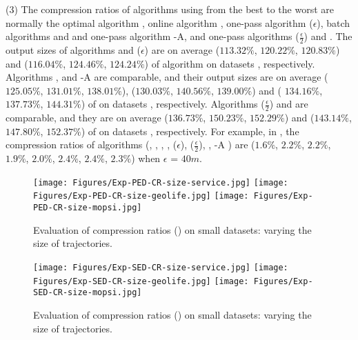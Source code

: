 \sstab(3) The compression ratios of algorithms using \ped from the best
to the worst are normally the optimal algorithm \opt, online algorithm \bqsa, one-pass algorithm \siped($\epsilon$), batch algorithms \tpa and \dpa and one-pass algorithm {\operb-A}, and one-pass algorithms \siped($\frac{\epsilon}{2}$) and \operb.
The output sizes of algorithms \bqsa and \siped({$\epsilon$}) are on average
($113.32\%$, $120.22\%$, $120.83\%$) and ($116.04\%$, $124.46\%$, $124.24\%$) of algorithm \opt
on datasets \dSets, respectively.
Algorithms \tpa, \dpa and {\operb-A} are comparable, and their output sizes are on average
($125.05\%$, $131.01\%$, $138.01\%$), ($130.03\%$, $140.56\%$, $139.00\%$) and {( $134.16\%$, $137.73\%$, $144.31\%$)} of \opt
on datasets \dSets, respectively.
Algorithms \siped($\frac{\epsilon}{2}$) and \operb are comparable, and they are on average
($136.73\%$, $150.23\%$, $152.29\%$) and ($143.14\%$, $147.80\%$, $152.37\%$) of \opt on datasets \dSets, respectively.
%
For example, in \mopsi, the compression ratios of algorithms
(\opt, \tpa, \dpa, \bqsa, \siped(${\epsilon}$), \siped($\frac{\epsilon}{2}$), \operb, {\operb-A} ) are ($1.6\%$, $2.2\%$, $2.2\%$, $1.9\%$, $2.0\%$, $2.4\%$, $2.4\%$, {$2.3\%$}) when $\epsilon$ = $40m$.
%
\begin{figure*}[tb!]
	\centering
	\texttt{[image: Figures/Exp-PED-CR-size-service.jpg]} 	\hspace{0.5ex}
	\texttt{[image: Figures/Exp-PED-CR-size-geolife.jpg]}	\hspace{0.5ex}
	\texttt{[image: Figures/Exp-PED-CR-size-mopsi.jpg]}		
	\vspace{-2ex}
	\caption{\small Evaluation of compression ratios (\ped) on small datasets: varying the size of
		trajectories.}
	\label{fig:cr-ped-size}
	\vspace{-2ex}
\end{figure*}
\begin{figure*}[tb!]
	\centering
	\texttt{[image: Figures/Exp-SED-CR-size-service.jpg]} 	\hspace{0.5ex}
	\texttt{[image: Figures/Exp-SED-CR-size-geolife.jpg]}	\hspace{0.5ex}
	\texttt{[image: Figures/Exp-SED-CR-size-mopsi.jpg]}		
	\vspace{-2ex}
	\caption{\small Evaluation of compression ratios (\sed) on small datasets: varying the size of
		trajectories.}
	\label{fig:cr-sed-size}
	\vspace{-2ex}
\end{figure*}
